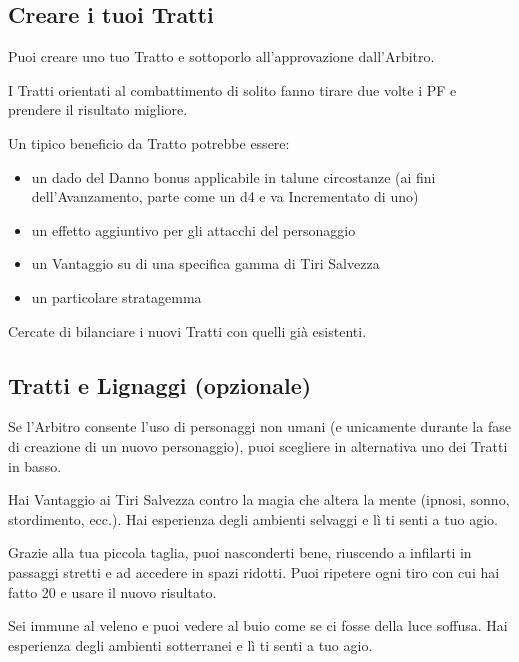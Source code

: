 \documentclass[itdr]{subfiles}
\begin{document}
\vfill
\vfill
{}
\vfill
\vfill

\begin{dbox}
\subsection*{Creare i tuoi Tratti}

Puoi creare uno tuo Tratto e sottoporlo all’approvazione dall’Arbitro.

I Tratti orientati al combattimento di solito fanno tirare due volte i PF e prendere il risultato migliore.

Un tipico beneficio da Tratto potrebbe essere:
\begin{itemize}
	\item un dado del Danno bonus applicabile in talune circostanze (ai fini dell’Avanzamento, parte come un d4 e va Incrementato di uno)
	\item un effetto aggiuntivo per gli attacchi del personaggio
	\item un Vantaggio su di una specifica gamma di Tiri Salvezza
	\item un particolare stratagemma
\end{itemize}

Cercate di bilanciare i nuovi Tratti con quelli già esistenti.\hspace{-0.6em}
\end{dbox}

\vfill
\subsection*{Tratti e Lignaggi (opzionale)}

Se l’Arbitro consente l’uso di personaggi non umani (e unicamente durante la fase di creazione di un nuovo personaggio), puoi scegliere in alternativa uno dei Tratti in basso.

\vfill
{}
Hai Vantaggio ai Tiri Salvezza contro la magia che altera la mente (ipnosi, sonno, stordimento, ecc.). Hai esperienza degli ambienti selvaggi e lì ti senti a tuo agio.

\vfill
{}
Grazie alla tua piccola taglia, puoi nasconderti bene, riuscendo a infilarti in passaggi stretti e ad accedere in spazi ridotti. Puoi ripetere ogni tiro con cui hai fatto 20 e usare il nuovo risultato.

Sei immune al veleno e puoi vedere al buio come se ci fosse della luce soffusa. Hai esperienza degli ambienti sotterranei e lì ti senti a tuo agio.
\end{document}
